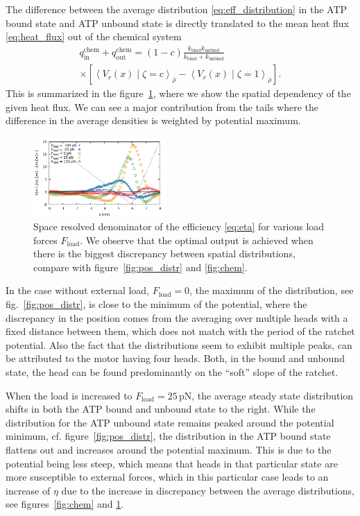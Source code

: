\documentclass[aps,pre,twocolumn,showpacs,showkeys,superscriptaddress,floatfix]{revtex4-1}
\begin{document}
The difference between the average distribution \eqref{eq:eff_distribution} in the ATP bound state and ATP unbound state is directly translated to the mean heat flux \eqref{eq:heat_flux} out of the chemical system
\begin{multline*}
q_\text{in}^\text{chem} + q_\text{out}^\text{chem} 
= (1-c) \frac{ k_\text{bind} k_\text{unbind} }{ k_\text{bind} + k_\text{unbind} } 
\\ \times
\left[ \left\langle V_r(x) \middle| \zeta = c \right\rangle_{\bar{\rho}} - \left\langle V_r(x) \middle| \zeta = 1 \right\rangle_{\bar{\rho}} \right] .
\end{multline*} 
This is summarized in the figure~\ref{fig:chem_energy_distr}, 
where we show the spatial dependency of the given heat flux.
We can see a major contribution from the tails where the difference in the average densities is weighted by potential maximum.
\begin{figure}[t]
\centering
\includegraphics[width=0.45\textwidth,height=!]{chem_energy_distr_all_F}
\caption{
\label{fig:chem_energy_distr}
Space resolved denominator of the efficiency \eqref{eq:eta} for various load forces $F_\text{load}$. %
We observe that the optimal output is achieved when there is the biggest discrepancy between spatial distributions, compare with figure~\ref{fig:pos_distr} and \ref{fig:chem}. 
}
\end{figure}

In the case without external load, $F_\text{load}=0$, 
the maximum of the distribution, see fig.~\ref{fig:pos_distr}, is close to the minimum of the potential,  
where the discrepancy in the position comes from the averaging over multiple heads with a fixed distance between them, 
which does not match with the period of the ratchet potential. 
Also the fact that the distributions seem to exhibit multiple peaks, can be attributed to the motor having four heads. 
Both, in the bound and unbound state, the head can be found predominantly on the ``soft'' slope of the ratchet.

When the load is increased to $F_\text{load} = 25 \, \mathrm{pN}$, the average steady state distribution shifts in both the ATP bound and unbound state to the right. 
While the distribution for the ATP unbound state remains peaked around the potential minimum, cf. figure~\ref{fig:pos_distr},
the distribution in the ATP bound state flattens out and increases around the potential maximum. 
This is due to the potential being less steep, which means that heads in that particular state are more susceptible to external forces,  
which in this particular case leads to an increase of $\eta$ due to the increase in discrepancy between the average distributions, 
see figures~\ref{fig:chem} and \ref{fig:chem_energy_distr}. 
\end{document}
